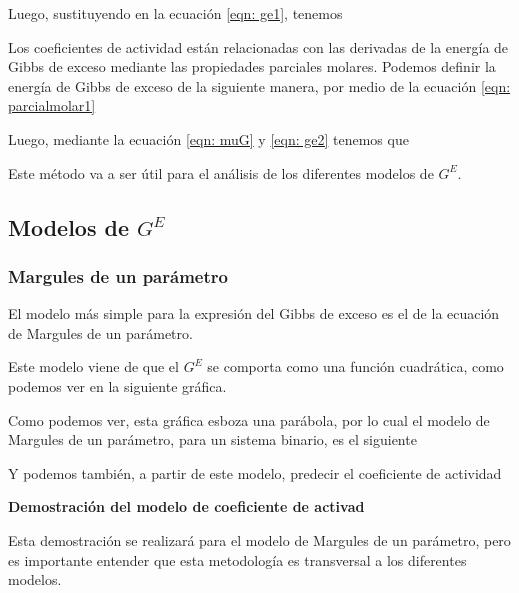 Luego, sustituyendo en la ecuación \ref{eqn: ge1}, tenemos

Los coeficientes de actividad están relacionadas con las derivadas de la energía de Gibbs de exceso mediante las propiedades parciales molares.
Podemos definir la energía de Gibbs de exceso de la siguiente manera, por medio de la ecuación \ref{eqn: parcialmolar1}

Luego, mediante la ecuación \ref{eqn: muG} y \ref{eqn: ge2} tenemos que


Este método va a ser útil para el análisis de los diferentes modelos de $G^{E}$.
\clearpage
\subsection{Modelos de $G^{E}$}
\subsubsection{Margules de un parámetro}
El modelo más simple para la expresión del Gibbs de exceso es el de la ecuación de Margules de un parámetro.

Este modelo viene de que el $G^{E}$ se comporta como una función cuadrática, como podemos ver en la siguiente gráfica.


Como podemos ver, esta gráfica esboza una parábola, por lo cual el modelo de Margules de un parámetro, para un sistema binario, es el siguiente


Y podemos también, a partir de este modelo, predecir el coeficiente de actividad


\textbf{Demostración del modelo de coeficiente de activad}

Esta demostración se realizará para el modelo de Margules de un parámetro, pero es importante entender que esta metodología 
es transversal a los diferentes modelos.

